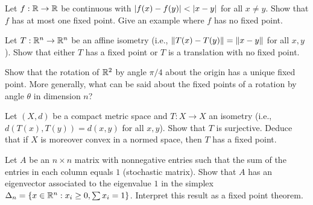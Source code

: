 \begin{exercise}
Let $f : \mathbb{R} \to \mathbb{R}$ be continuous with $\left| f(x) - f(y) \right| < \left| x - y \right|$ for
all $x \neq y$. Show that $f$ has at most one fixed point. Give an example
where $f$ has no fixed point.
\end{exercise}

\begin{exercise}
Let $T : \mathbb{R}^n \to \mathbb{R}^n$ be an affine isometry (i.e.,
$\left\| T(x) - T(y) \right\| = \left\| x - y \right\|$ for all $x, y$). Show that either $T$ has
a fixed point or $T$ is a translation with no fixed point.
\end{exercise}

\begin{exercise}
Show that the rotation of $\mathbb{R}^2$ by angle $\pi/4$ about the origin has a unique
fixed point. More generally, what can be said about the fixed points of a
rotation by angle $\theta$ in dimension $n$?
\end{exercise}

\begin{exercise}
Let $(X, d)$ be a compact metric space and $T : X \to X$ an isometry (i.e.,
$d(T(x), T(y)) = d(x,y)$ for all $x,y$). Show that $T$ is surjective.
Deduce that if $X$ is moreover convex in a normed space, then $T$ has a fixed
point.
\end{exercise}

\begin{exercise}
Let $A$ be an $n \times n$ matrix with nonnegative entries such that the sum of
the entries in each column equals $1$ (stochastic matrix). Show that $A$ has an
eigenvector associated to the eigenvalue $1$ in the simplex
$\Delta_n = \{x \in \mathbb{R}^n : x_i \geq 0, \sum x_i = 1\}$. Interpret this result
as a fixed point theorem.
\end{exercise}
